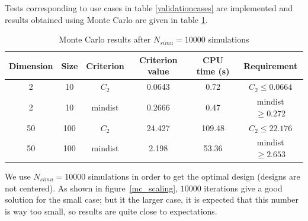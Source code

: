Tests corresponding to use cases in table \ref{validationcases} are implemented and results obtained using Monte Carlo are given in table \ref{mc_validation_cases}.\\
\begin{table}[!h]
\begin{center}
\begin{tabular}{|c|c|c|c|c|c|}
 \hline
 Dimension & Size & Criterion & Criterion value & CPU time (s) & Requirement\\
 \hline
 2 & 10 & $C_2$ & 0.0643 & 0.72 & $C_2 \leq 0.0664$\\
 \hline
 2 & 10 & mindist & 0.2666 & 0.47 & mindist $\geq 0.272$\\
 \hline
 50 & 100 & $C_2$ & 24.427 & 109.48 & $C_2 \leq 22.176$\\
 \hline
 50 & 100 & mindist & 2.198 & 53.36 & mindist $\geq 2.653$\\
 \hline
\end{tabular}
\end{center}
\caption{Monte Carlo results after $N_{simu}=10000$ simulations}
\label{mc_validation_cases}
\end{table}

We use $N_{simu}=10000$ simulations in order to get the optimal design (designs are not centered).  As shown in figure~\ref{mc_scaling}, $10000$ iterations give a good solution for the small case; but it the larger case, it is expected that this number is way too small, so results are quite close to expectations.

